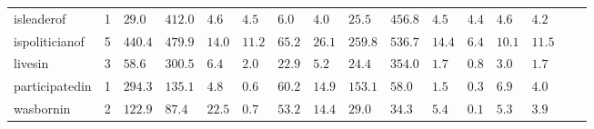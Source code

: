 \begin{tabular}{lr|lllllll|lllllll}
    isleaderof &        1 &           $29.0$ & $412.0$ &      $4.6$ &  $\bm{4.5}$ &           $6.0$ &           $4.0$ &           $25.5$ & $456.8$ &  $4.5$ & $\bm{4.4}$ &           $4.6$ &           $4.2$ \\
ispoliticianof &        5 &          $440.4$ & $479.9$ &     $14.0$ & $\bm{11.2}$ &          $65.2$ &          $26.1$ &          $259.8$ & $536.7$ & $14.4$ & $\bm{6.4}$ &          $10.1$ &          $11.5$ \\
       livesin &        3 &           $58.6$ & $300.5$ &      $6.4$ &  $\bm{2.0}$ &          $22.9$ &           $5.2$ &           $24.4$ & $354.0$ &  $1.7$ & $\bm{0.8}$ &           $3.0$ &           $1.7$ \\
participatedin &        1 &          $294.3$ & $135.1$ &      $4.8$ &  $\bm{0.6}$ &          $60.2$ &          $14.9$ &          $153.1$ &  $58.0$ &  $1.5$ & $\bm{0.3}$ &           $6.9$ &           $4.0$ \\
     wasbornin &        2 &          $122.9$ &  $87.4$ &     $22.5$ &  $\bm{0.7}$ &          $53.2$ &          $14.4$ &           $29.0$ &  $34.3$ &  $5.4$ & $\bm{0.1}$ &           $5.3$ &           $3.9$ \\
\bottomrule
\end{tabular}
